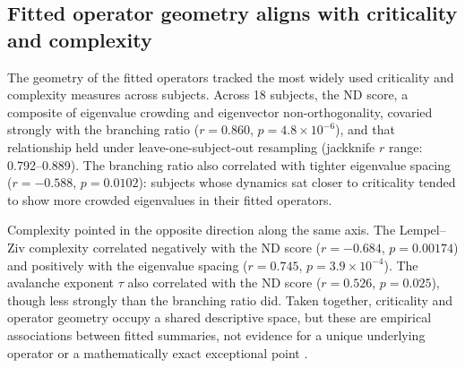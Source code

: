 \documentclass[preprint,12pt,nonatbib]{elsarticle}
\begin{document}
\subsection{Fitted operator geometry aligns with criticality and complexity}
The geometry of the fitted operators tracked the most widely used criticality and complexity measures across subjects. Across 18 subjects, the ND score, a composite of eigenvalue crowding and eigenvector non-orthogonality, covaried strongly with the branching ratio ($r = 0.860$, $p = 4.8 \times 10^{-6}$), and that relationship held under leave-one-subject-out resampling (jackknife $r$ range: 0.792--0.889). The branching ratio also correlated with tighter eigenvalue spacing ($r = -0.588$, $p = 0.0102$): subjects whose dynamics sat closer to criticality tended to show more crowded eigenvalues in their fitted operators.

Complexity pointed in the opposite direction along the same axis. The Lempel--Ziv complexity correlated negatively with the ND score ($r = -0.684$, $p = 0.00174$) and positively with the eigenvalue spacing ($r = 0.745$, $p = 3.9 \times 10^{-4}$). The avalanche exponent $\tau$ also correlated with the ND score ($r = 0.526$, $p = 0.025$), though less strongly than the branching ratio did. Taken together, criticality and operator geometry occupy a shared descriptive space, but these are empirical associations between fitted summaries, not evidence for a unique underlying operator or a mathematically exact exceptional point \citep{Bergholtz2021}.
\end{document}
